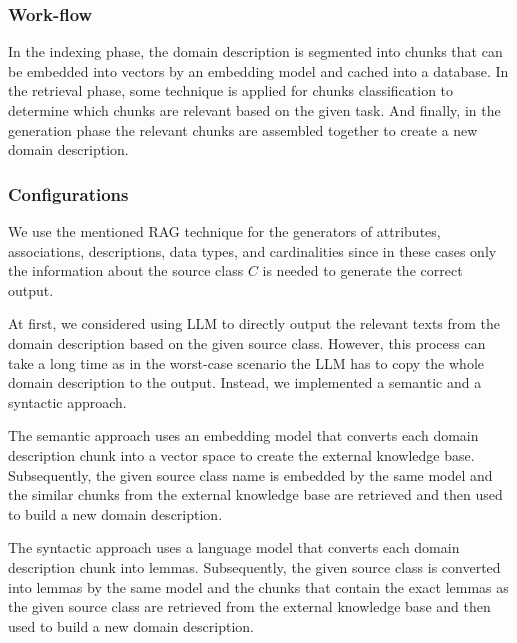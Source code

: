 \subsubsection{Work-flow}
\label{sec:RAG_work_flow_dd}

In the indexing phase, the domain description is segmented into chunks that can be embedded into vectors by an embedding model and cached into a database. In the retrieval phase, some technique is applied for chunks classification to determine which chunks are relevant based on the given task. And finally, in the generation phase the relevant chunks are assembled together to create a new domain description.


\subsubsection{Configurations}
\label{sec:rag_configurations}

We use the mentioned RAG technique for the generators of attributes, associations, descriptions, data types, and cardinalities since in these cases only the information about the source class $C$ is needed to generate the correct output.

At first, we considered using LLM to directly output the relevant texts from the domain description based on the given source class. However, this process can take a long time as in the worst-case scenario the LLM has to copy the whole domain description to the output. Instead, we implemented a semantic and a syntactic approach.


The semantic approach uses an embedding model that converts each domain description chunk into a vector space to create the external knowledge base. Subsequently, the given source class name is embedded by the same model and the similar chunks from the external knowledge base are retrieved and then used to build a new domain description.

The syntactic approach uses a language model that converts each domain description chunk into lemmas. Subsequently, the given source class is converted into lemmas by the same model and the chunks that contain the exact lemmas as the given source class are retrieved from the external knowledge base and then used to build a new domain description.


